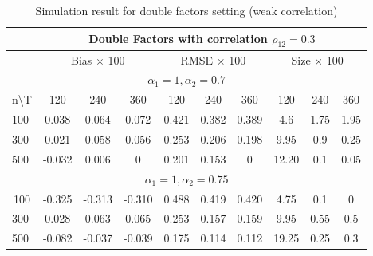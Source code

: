 	\begin{table}[]
		\caption{Simulation result for double factors setting (weak correlation)}\label{table:exp3}
		\centering
	\begin{tabular}{lccccccccc}
		\hline
		\hline
		\multicolumn{1}{l|}{}                   & \multicolumn{9}{c}{Double Factors with correlation $\rho_{12} = 0.3$}                                                               \\ \hline
		\multicolumn{1}{l|}{}                   & \multicolumn{3}{c|}{Bias $\times$ 100}        & \multicolumn{3}{c|}{RMSE $\times$ 100}     & \multicolumn{3}{c}{Size $\times$ 100} \\ \hline
		\multicolumn{10}{c}{$\alpha_1 = 1, \alpha_2 = 0.7$}                                                                                                                            \\ \hline
		\multicolumn{1}{l|}{n\textbackslash{}T} & 120    & 240    & \multicolumn{1}{c|}{360}    & 120   & 240   & \multicolumn{1}{c|}{360}   & 120          & 240        & 360        \\ \hline
		\multicolumn{1}{l|}{100}                & 0.038  & 0.064  & \multicolumn{1}{c|}{0.072}  & 0.421 & 0.382 & \multicolumn{1}{c|}{0.389} & 4.6          & 1.75       & 1.95       \\
		\multicolumn{1}{l|}{300}                & 0.021  & 0.058  & \multicolumn{1}{c|}{0.056}  & 0.253 & 0.206 & \multicolumn{1}{c|}{0.198} & 9.95         & 0.9        & 0.25       \\
		\multicolumn{1}{l|}{500}                & -0.032 & 0.006  & \multicolumn{1}{c|}{0}      & 0.201 & 0.153 & \multicolumn{1}{c|}{0}     & 12.20        & 0.1        & 0.05       \\ \hline
		\multicolumn{10}{c}{$\alpha_1 = 1, \alpha_2 = 0.75$}                                                                                                                          \\ \hline
		\multicolumn{1}{c|}{100}                & -0.325 & -0.313 & \multicolumn{1}{c|}{-0.310} & 0.488 & 0.419 & \multicolumn{1}{c|}{0.420} & 4.75         & 0.1        & 0          \\
		\multicolumn{1}{l|}{300}                & 0.028  & 0.063  & \multicolumn{1}{c|}{0.065}  & 0.253 & 0.157 & \multicolumn{1}{c|}{0.159} & 9.95         & 0.55       & 0.5        \\
		\multicolumn{1}{l|}{500}                & -0.082 & -0.037 & \multicolumn{1}{c|}{-0.039} & 0.175 & 0.114 & \multicolumn{1}{c|}{0.112} & 19.25        & 0.25       & 0.3        \\ \hline

\end{tabular}
\end{table}

